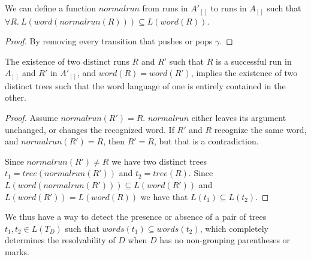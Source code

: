 \documentclass[runningheads]{llncs}
\newcommand{\words}{\mathit{words}} %
\newcommand{\pospl}{[}
\newcommand{\pospr}{]}
\newcommand{\posp}[1]{\pospl#1\pospr}
\newcommand{\runtotree}{\mathit{tree}}
\newcommand{\runtoword}{\mathit{word}}
\newcommand{\runprimetorun}{\mathit{normalrun}}
\begin{document}
\begin{lemma}
  We can define a function $\runprimetorun$ from runs in $A'_{\posp{}}$ to runs in $A_{\posp{}}$ such that $\forall R.\ L(\runtoword(\runprimetorun(R))) \subseteq L(\runtoword(R))$.
\end{lemma}

\begin{proof}
  By removing every transition that pushes or pops $\gamma$.
\end{proof}

\begin{theorem}
  The existence of two distinct runs $R$ and $R'$ such that $R$ is a successful run in $A_{\posp{}}$ and $R'$ in $A'_{\posp{}}$, and $\runtoword(R) = \runtoword(R')$, implies the existence of two distinct trees such that the word language of one is entirely contained in the other.
\end{theorem}

\begin{proof}
  Assume $\runprimetorun(R') = R$. $\runprimetorun$ either leaves its argument unchanged, or changes the recognized word. If $R'$ and $R$ recognize the same word, and $\runprimetorun(R') = R$, then $R' = R$, but that is a contradiction.

  Since $\runprimetorun(R') \neq R$ we have two distinct trees $t_1 = \runtotree(\runprimetorun(R'))$ and $t_2 = \runtotree(R)$. Since $L(\runtoword(\runprimetorun(R'))) \subseteq L(\runtoword(R'))$ and $L(\runtoword(R')) = L(\runtoword(R))$ we have that $L(t_1) \subseteq L(t_2)$.
\end{proof}

We thus have a way to detect the presence or absence of a pair of trees $t_1, t_2 \in L(T_D)$ such that $\words(t_1) \subseteq \words(t_2)$, which completely determines the resolvability of $D$ when $D$ has no non-grouping parentheses or marks.



\end{document}
